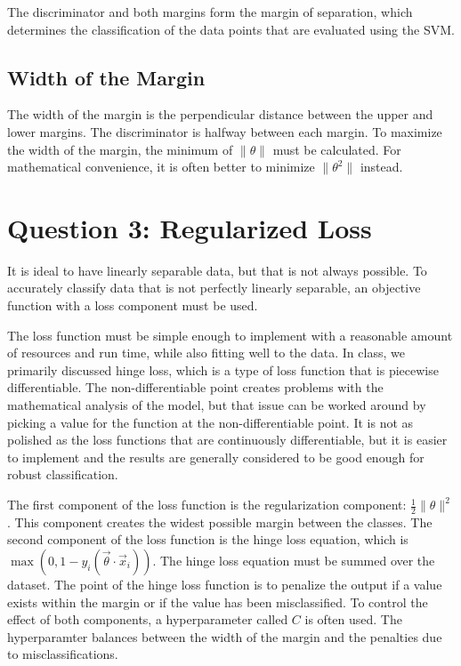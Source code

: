 \documentclass[letterpaper]{article}
\begin{document}
The discriminator and both margins form the margin of separation, which determines the classification of the data points that are evaluated using the SVM.

\subsection{Width of the Margin}
The width of the margin is the perpendicular distance between the upper and lower margins. The discriminator is halfway between each margin. To maximize the width of the margin, the minimum of $\|\theta\|$ must be calculated. For mathematical convenience, it is often better to minimize $\|\theta^2\|$ instead.

\section{Question 3: Regularized Loss}
It is ideal to have linearly separable data, but that is not always possible. To accurately classify data that is not perfectly linearly separable, an objective function with a loss component must be used.

The loss function must be simple enough to implement with a reasonable amount of resources and run time, while also fitting well to the data. In class, we primarily discussed hinge loss, which is a type of loss function that is piecewise differentiable. The non-differentiable point creates problems with the mathematical analysis of the model, but that issue can be worked around by picking a value for the function at the non-differentiable point. It is not as polished as the loss functions that are continuously differentiable, but it is easier to implement and the results are generally considered to be good enough for robust classification.

The first component of the loss function is the regularization component: $\frac{1}{2} \|\theta\|^2$. This component creates the widest possible margin between the classes. The second component of the loss function is the hinge loss equation, which is $\max(0, 1 - y_i(\overrightarrow{\theta} \cdot \overrightarrow{x}_i))$. The hinge loss equation must be summed over the dataset. The point of the hinge loss function is to penalize the output if a value exists within the margin or if the value has been misclassified. To control the effect of both components, a hyperparameter called $C$ is often used. The hyperparamter balances between the width of the margin and the penalties due to misclassifications.
\end{document}
